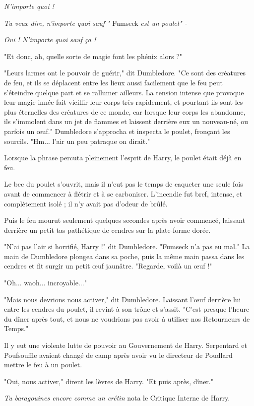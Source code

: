\emph{N'importe quoi !} 

\emph{Tu veux dire, n'importe quoi sauf "} Fumseck\emph{ est un poulet" -} 

\emph{Oui ! N'importe quoi sauf ça !} 

"Et donc, ah, quelle sorte de magie font les phénix alors ?"

"Leurs larmes ont le pouvoir de guérir," dit Dumbledore. "Ce sont des créatures de feu, et ils se déplacent entre les lieux aussi facilement que le feu peut s'éteindre quelque part et se rallumer ailleurs. La tension intense que provoque leur magie innée fait vieillir leur corps très rapidement, et pourtant ils sont les plus éternelles des créatures de ce monde, car lorsque leur corps les abandonne, ils s'immolent dans un jet de flammes et laissent derrière eux un nouveau-né, ou parfois un œuf." Dumbledore s'approcha et inspecta le poulet, fronçant les sourcils. "Hm... l'air un peu patraque on dirait."

Lorsque la phrase percuta pleinement l'esprit de Harry, le poulet était déjà en feu.

Le bec du poulet s'ouvrit, mais il n'eut pas le temps de caqueter une seule fois avant de commencer à flétrir et à se carboniser. L'incendie fut bref, intense, et complètement isolé ; il n'y avait pas d'odeur de brûlé.

Puis le feu mourut seulement quelques secondes après avoir commencé, laissant derrière un petit tas pathétique de cendres sur la plate-forme dorée.

"N'ai pas l'air si horrifié, Harry !" dit Dumbledore. "Fumseck n'a pas eu mal." La main de Dumbledore plongea dans sa poche, puis la même main passa dans les cendres et fit surgir un petit œuf jaunâtre. "Regarde, voilà un œuf !"

"Oh... waoh... incroyable..."

"Mais nous devrions nous activer," dit Dumbledore. Laissant l'œuf derrière lui entre les cendres du poulet, il revint à son trône et s'assit. "C'est presque l'heure du dîner après tout, et nous ne voudrions pas avoir à utiliser nos Retourneurs de Temps."

Il y eut une violente lutte de pouvoir au Gouvernement de Harry. Serpentard et Poufsouffle avaient changé de camp après avoir vu le directeur de Poudlard mettre le feu à un poulet.

"Oui, nous activer," dirent les lèvres de Harry. "Et puis après, dîner."

\emph{Tu baragouines encore comme un crétin}  nota le Critique Interne de Harry.

